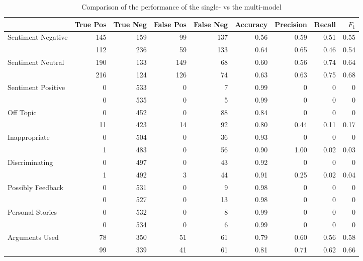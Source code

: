 \documentclass[11pt,a4paper]{article}
\begin{document}
\begin{table}[t!]
	\centering
	\begin{tabular}{l r r r r r r r r}
		& True Pos & True Neg & False Pos & False Neg & Accuracy & Precision & Recall & $F_1$ \\
		\hline
		Sentiment Negative & 145 & 159 & 99 & 137 & 0.56 & 0.59 & 0.51 & 0.55 \\
		& 112 & 236 & 59 & 133 & 0.64 & 0.65 & 0.46 & 0.54 \\
		\hline
		Sentiment Neutral & 190 & 133 & 149 & 68 & 0.60 & 0.56 & 0.74 & 0.64 \\
		& 216 & 124 & 126 & 74 & 0.63 & 0.63 & 0.75 & 0.68 \\
		\hline
		Sentiment Positive & 0 & 533 & 0 & 7 & 0.99 & 0 & 0 & 0 \\
		& 0 & 535 & 0 & 5 & 0.99 & 0 & 0 & 0 \\
		\hline
		Off Topic & 0 & 452 & 0 & 88 & 0.84 & 0 & 0 & 0 \\
		& 11 & 423 & 14 & 92 & 0.80 & 0.44 & 0.11 & 0.17 \\
		\hline
		Inappropriate & 0 & 504 & 0 & 36 & 0.93 & 0 & 0 & 0 \\
		& 1 & 483 & 0 & 56 & 0.90 & 1.00 & 0.02 & 0.03 \\
		\hline
		Discriminating & 0 & 497 & 0 & 43 & 0.92 & 0 & 0 & 0 \\
		& 1 & 492 & 3 & 44 & 0.91 & 0.25 & 0.02 & 0.04 \\
		\hline
		Possibly Feedback & 0 & 531 & 0 & 9 & 0.98 & 0 & 0 & 0 \\
		& 0 & 527 & 0 & 13 & 0.98 & 0 & 0 & 0 \\
		\hline
		Personal Stories & 0 & 532 & 0 & 8 & 0.99 & 0 & 0 & 0 \\
		& 0 & 534 & 0 & 6 & 0.99 & 0 & 0 & 0 \\
		\hline
		Arguments Used & 78 & 350 & 51 & 61 & 0.79 & 0.60 & 0.56 & 0.58\\
		& 99 & 339 & 41 & 61 & 0.81 & 0.71 & 0.62 & 0.66 \\
	\end{tabular}
	\caption{Comparison of the performance of the single- vs the multi-model}
	\label{tab:results}
\end{table}
\end{document}
